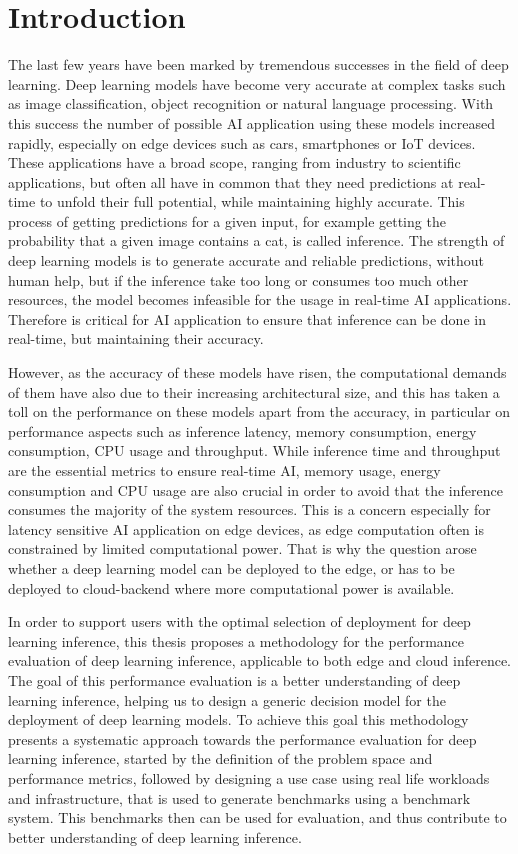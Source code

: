 \chapter{Introduction}


The last few years have been marked by tremendous successes in the field of deep learning.
Deep learning models have become very accurate at complex tasks such as image classification, object recognition or natural language processing. 
With this success the number of possible AI application using these models increased rapidly, especially on edge devices such as cars, smartphones or IoT devices.
These applications have a broad scope, ranging from industry to scientific applications, but often all have in common that they need predictions at real-time to unfold their full potential, while maintaining highly accurate.
This process of getting predictions for a given input, for example getting the probability that a given image contains a cat, is called inference.
The strength of deep learning models is to generate accurate and reliable predictions, without human help, but if the inference take too long or consumes too much other resources, the model becomes infeasible for the usage in real-time AI applications.
Therefore is critical for AI application to ensure that inference can be done in real-time, but maintaining their accuracy.

However, as the accuracy of these models have risen, the computational demands of them have also due to their increasing architectural size, and this has taken a toll on the performance on these models apart from the accuracy, in particular on performance aspects such as inference latency, memory consumption, energy consumption, CPU usage and throughput. 
While inference time and throughput are the essential metrics to ensure real-time AI, memory usage, energy consumption and CPU usage are also crucial in order to avoid that the inference consumes the majority of the system resources.
This is a concern especially for latency sensitive AI application on edge devices, as edge computation often is constrained by limited computational power. 
That is why the question arose whether a deep learning model can be deployed to the edge, or has to be deployed to cloud-backend where more computational power is available. 


In order to support users with the optimal selection of deployment for deep learning inference, this thesis proposes a methodology for the performance evaluation of deep learning inference, applicable to both edge and cloud inference.
The goal of this performance evaluation is a better understanding of deep learning inference, helping us to design a generic decision model for the deployment of deep learning models.
To achieve this goal this methodology presents a systematic approach towards the performance evaluation for deep learning inference, started by the definition of the problem space and performance metrics, followed by designing a use case using real life workloads and infrastructure, that is used to generate benchmarks using a benchmark system.
This benchmarks then can be used for evaluation, and thus contribute to better understanding of deep learning inference.

